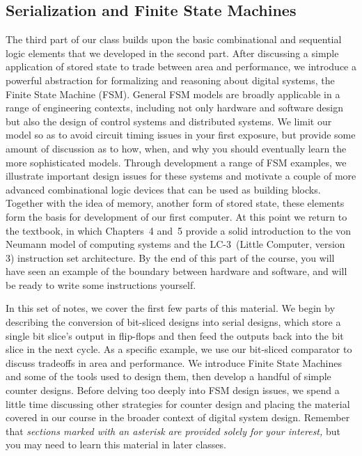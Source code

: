 \classtitle

\subsection{Serialization and Finite State Machines}

The third part of our class builds upon the basic combinational and
sequential logic elements that we developed in the second part.
%
After discussing a simple application of stored state
to trade between area and performance,
%
we introduce a powerful abstraction for formalizing and reasoning about
digital systems, the Finite State Machine (FSM).
%
General FSM models are broadly applicable in a range of engineering
contexts, including not only hardware and software design but also
the design of control systems and distributed systems.  We limit our
model so as to avoid circuit timing issues in your first exposure, but
provide some amount of discussion as to how, when, and why you should 
eventually learn the more sophisticated models.
%
Through development a range of FSM examples, we illustrate important 
design issues for these systems and motivate a couple of more advanced 
combinational logic devices that can be used as building blocks.
%
Together with the idea of memory, another form of stored state,
these elements form the basis for development of our first computer.
%
At this point we return to the textbook, in which Chapters~4 and~5
provide a solid introduction to the von Neumann model of computing systems
and the \mbox{LC-3}~(Little Computer, version 3) instruction set 
architecture.  By the end of this part of the course, you will have
seen an example of the boundary between hardware and software, and will
be ready to write some instructions yourself.

In this set of notes, we cover the first few parts of this material.
We begin by describing the conversion of bit-sliced designs into 
serial designs, which store a single bit slice's output in 
flip-flops and then feed the outputs back into the bit slice in the next
cycle.  As a specific example, we use our bit-sliced comparator 
to discuss tradeoffs in area and performance.  We introduce
Finite State Machines and some of the tools used to design them,
then develop a handful of simple counter designs.  Before delving
too deeply into FSM design issues, we spend a little time discussing
other strategies for counter design and placing the material covered
in our course in the broader context of digital system design.
%
Remember that
{\em sections marked with an asterisk are provided solely for your
interest,} but you may need to learn this material in later
classes.\vspace{6pt}


